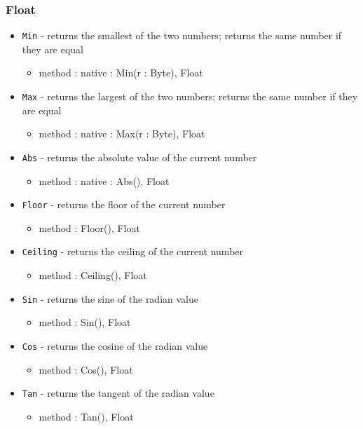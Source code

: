 \documentclass[12pt]{article}
\begin{document}
\subsubsection{Float}
\begin{itemize}
\item \texttt{Min} - returns the smallest of the two numbers; returns the same number if they are equal
  \begin{itemize}
  \item method : native : Min(r : Byte), Float
  \end{itemize}
\item \texttt{Max} - returns the largest of the two numbers; returns the same number if they are equal
  \begin{itemize}
  \item method : native : Max(r : Byte), Float
  \end{itemize}
\item \texttt{Abs} - returns the absolute value of the current number
  \begin{itemize}
  \item method : native : Abs(), Float
  \end{itemize}
\item \texttt{Floor} - returns the floor of the current number
  \begin{itemize}
  \item method : Floor(), Float
  \end{itemize}
\item \texttt{Ceiling} - returns the ceiling of the current number
  \begin{itemize}
  \item method : Ceiling(), Float
  \end{itemize}
\item \texttt{Sin} - returns the sine of the radian value
  \begin{itemize}
  \item method : Sin(), Float
  \end{itemize}
\item \texttt{Cos} - returns the cosine of the radian value
  \begin{itemize}
  \item method : Cos(), Float
  \end{itemize}
\item \texttt{Tan} - returns the tangent of the radian value
  \begin{itemize}
  \item method : Tan(), Float

\end{itemize}
\end{itemize}
\end{document}

